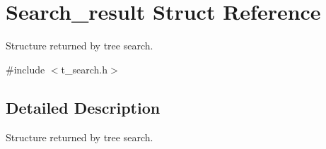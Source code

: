 \section{Search\_\-result Struct Reference}
\label{structSearch__result}


Structure returned by tree search.  




{\ttfamily \#include $<$t\_\-search.h$>$}



\subsection{Detailed Description}
Structure returned by tree search. 